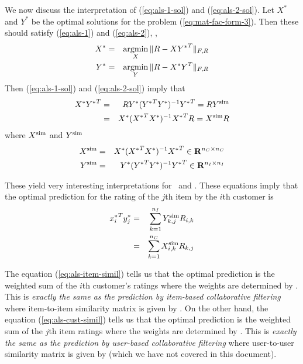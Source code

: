 We now discuss the interpretation of (\ref{eq:als-1-sol}) and (\ref{eq:als-2-sol}).
Let $X^\ast$ and $Y^\ast$ be the optimal solutions for the problem (\ref{eq:mat-fac-form-3}).
Then these should satisfy (\ref{eq:als-1}) and (\ref{eq:als-2}),
\ie,
\begin{eqnarray}
X^\ast &=& \mathop{\mathrm {argmin}}_{X} \|R - X{Y^\ast}^T \|_{F,R}
\\
Y^\ast &=& \mathop{\mathrm {argmin}}_{Y} \|R - X^\ast Y^T\|_{F,R}
\end{eqnarray}
Then (\ref{eq:als-1-sol}) and (\ref{eq:als-2-sol}) imply that
\begin{eqnarray}
X^\ast {Y^\ast}^T &=& R Y^\ast ({Y^\ast}^T Y^\ast)^{-1} {Y^\ast}^T = R Y^\mathrm{sim}
\\
&=& X^\ast ({X^\ast}^T X^\ast)^{-1} {X^\ast}^TR = X^\mathrm{sim} R
\end{eqnarray}
where
$X^\mathrm{sim}$
and
$Y^\mathrm{sim}$
\begin{eqnarray}
X^\mathrm{sim} &=& X^\ast ({X^\ast}^T X^\ast)^{-1} {X^\ast}^T\in \mathbf{R}^{{n_C} \times {n_C}}
\\
Y^\mathrm{sim} &=& Y^\ast ({Y^\ast}^T Y^\ast)^{-1} {Y^\ast}^T\in \mathbf{R}^{{n_I} \times {n_I}}
\end{eqnarray}

These yield very interesting interpretations for \Xsim\ and \Ysim.
These equations imply that the optimal prediction for the rating of the $j$th item by the $i$th customer is
\begin{eqnarray}
\label{eq:als-item-simil}
{x_i^\ast}^T y_j^\ast &=& \sum_{k=1}^{{n_I}} Y^\mathrm{sim}_{k,j} R_{i,k}
\\
\label{eq:als-cust-simil}
&=& \sum_{k=1}^{{n_C}} X^\mathrm{sim}_{i,k} R_{k,j}
\end{eqnarray}

The equation (\ref{eq:als-item-simil}) tells us that
the optimal prediction is the weighted sum of the $i$th customer's ratings
where the weights are determined by \Ysim.
This is \emph{exactly the same as the prediction by item-based collaborative filtering}
where item-to-item similarity matrix is given by \Ysim.
On the other hand,
the equation (\ref{eq:als-cust-simil}) tells us that
the optimal prediction is the weighted sum of the $j$th item ratings
where the weights are determined by \Xsim.
This is \emph{exactly the same as the prediction by user-based collaborative filtering}
where user-to-user similarity matrix is given by \Xsim
(which we have not covered in this document).



